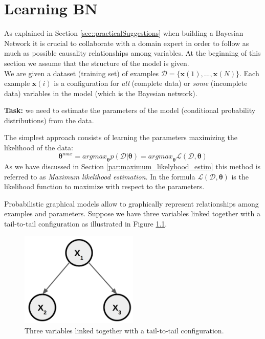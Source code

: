 \chapter{Learning BN}
\label{cha:learning_BN} As explained in Section \ref{sec::practicalSuggestions} when
building a Bayesian Network it is crucial to collaborate with a domain expert in
order to follow as much as possible causality relationships among variables. At
the beginning of this section we assume that the structure of the model is given.\\
We are given a dataset (training set) of examples
$\mathcal{D}= \{\pmb{x}(1), ..., \pmb{x}(N)\}$. Each example $\pmb{x}(i)$ is a configuration
for \textit{all} (complete data) or \textit{some} (incomplete data) variables in
the model (which is the Bayesian network).
\newline

\textbf{Task:} we need to estimate the parameters of the model (conditional probability
distributions) from the data.
\newline

The simplest approach consists of learning the parameters maximizing the
likelihood of the data:
\[
	{\pmb{\theta}}^{\mathit{max}}={\mathit{argmax}}_{\pmb{\theta}}p(\mathcal{D}|\pmb
	{\theta}) = \mathit{argmax}_{\pmb{\theta}}\mathcal{L}(\mathcal{D}, \pmb{\theta}
	)
\]
As we have discussed in Section \ref{par:maximum_likelyhood_estim} this method is
referred to as \textit{Maximum likelihood estimation}. In the formula $\mathcal{L}
(\mathcal{D}, \pmb{\theta})$ is the likelihood function to maximize with respect
to the parameters.
\newline

Probabilistic graphical models allow to graphically represent relationships among
examples and parameters. Suppose we have three variables linked together with a
tail-to-tail configuration as illustrated in Figure
\ref{fig:tailToTailLearningBN}.

\begin{figure}[H]
	\centering
	\includegraphics[width=0.5\textwidth]{
		images/10_BayesianNetworksLearning_tailToTailConfiguration.png
	}
	\caption{Three variables linked together with a tail-to-tail configuration.}
	\label{fig:tailToTailLearningBN}
\end{figure}

